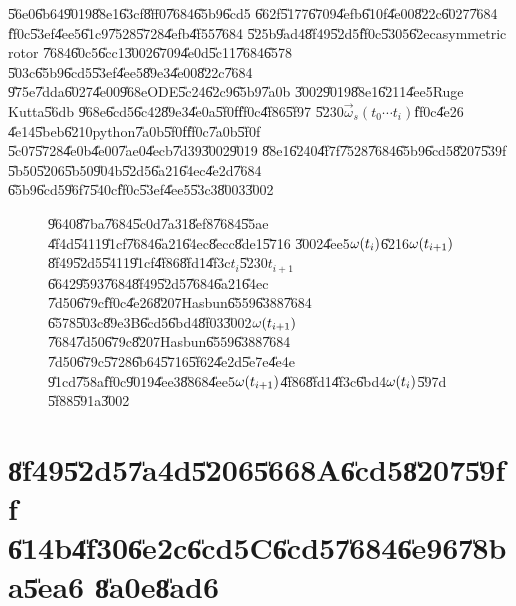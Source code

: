 \documentclass[12pt,a4paper]{article}
\begin{document}
\U{56e0}\U{6b64}\U{9019}\U{88e1}\U{63cf}\U{8ff0}\U{7684}\U{65b9}\U{6cd5}%
\U{662f}\U{5177}\U{6709}\U{4efb}\U{610f}\U{4e00}\U{822c}\U{6027}\U{7684}%
\U{ff0c}\U{53ef}\U{4ee5}\U{61c9}\U{7528}\U{5728}\U{4efb}\U{4f55}\U{7684}%
\U{525b}\U{9ad4}\U{8f49}\U{52d5}\U{ff0c}\U{5305}\U{62ec}asymmetric rotor%
\U{7684}\U{60c5}\U{6cc1}\U{3002}\U{6709}\U{4e0d}\U{5c11}\U{7684}\U{6578}%
\U{503c}\U{65b9}\U{6cd5}\U{53ef}\U{4ee5}\U{89e3}\U{4e00}\U{822c}\U{7684}%
\U{975e}\U{7dda}\U{6027}\U{4e00}\U{968e}ODE\U{5c24}\U{62c9}\U{65b9}\U{7a0b}%
\cite{matlab}\U{3002}\U{9019}\U{88e1}\U{6211}\U{4ee5}Ruge Kutta\U{56db}%
\U{968e}\U{6cd5}\U{6c42}\U{89e3}\U{4e0a}\U{5f0f}\U{ff0c}\U{4f86}\U{5f97}%
\U{5230}$\vec{\omega}_{s}\left( t_{0}\cdots t_{i}\right) $\U{ff0c}\U{4e26}%
\U{4e14}\U{5beb}\U{6210}python\U{7a0b}\U{5f0f}\U{ff0c}\U{7a0b}\U{5f0f}%
\U{5c07}\U{5728}\U{4e0b}\U{4e00}\U{7ae0}\U{4ecb}\U{7d39}\U{3002}\U{9019}%
\U{88e1}\U{6240}\U{4f7f}\U{7528}\U{7684}\U{65b9}\U{6cd5}\U{8207}\U{539f}%
\U{5b50}\U{5206}\U{5b50}\U{904b}\U{52d5}\U{6a21}\U{64ec}\U{4e2d}\U{7684}%
\U{65b9}\U{6cd5}\U{96f7}\U{540c}\U{ff0c}\U{53ef}\U{4ee5}\U{53c3}\U{8003}\cite%
{rapaport}\U{3002}

\begin{figure}[th]
\caption{\U{9640}\U{87ba}\U{7684}\U{5c0d}\U{7a31}\U{8ef8}\U{7684}\U{55ae}%
\U{4f4d}\U{5411}\U{91cf}\U{7684}\U{6a21}\U{64ec}\U{8ecc}\U{8de1}\U{5716}%
\U{3002}\U{4ee5}$\protect\omega (t_{i})$\U{6216}$\protect\omega (t_{i+1})$%
\U{8f49}\U{52d5}\U{5411}\U{91cf}\U{4f86}\U{8fd1}\U{4f3c}$t_{i}$\U{5230}$%
t_{i+1}$\U{6642}\U{9593}\U{7684}\U{8f49}\U{52d5}\U{7684}\U{6a21}\U{64ec}%
\U{7d50}\U{679c}\U{ff0c}\U{4e26}\U{8207}Hasbun\U{6559}\U{6388}\U{7684}%
\U{6578}\U{503c}\U{89e3}B\U{6cd5}\U{6bd4}\U{8f03}\U{3002}$\protect\omega %
(t_{i+1})$\U{7684}\U{7d50}\U{679c}\U{8207}Hasbun\U{6559}\U{6388}\U{7684}%
\U{7d50}\U{679c}\U{5728}\U{6b64}\U{5716}\U{5f62}\U{4e2d}\U{5e7e}\U{4e4e}%
\U{91cd}\U{758a}\U{ff0c}\U{9019}\U{4ee3}\U{8868}\U{4ee5}$\protect\omega %
(t_{i+1})$\U{4f86}\U{8fd1}\U{4f3c}\U{6bd4}$\protect\omega (t_{i})$\U{597d}%
\U{5f88}\U{591a}\U{3002}}
\label{wtiwti1}
\begin{center}
\fbox{}
\end{center}
\end{figure}

\bigskip

\part{\U{8f49}\U{52d5}\U{7a4d}\U{5206}\U{5668}A\U{6cd5}\U{8207}\U{59ff}%
\U{614b}\U{4f30}\U{6e2c}\U{6cd5}C\U{6cd5}\U{7684}\U{6e96}\U{78ba}\U{5ea6}%
\U{8a0e}\U{8ad6}}
\end{document}
